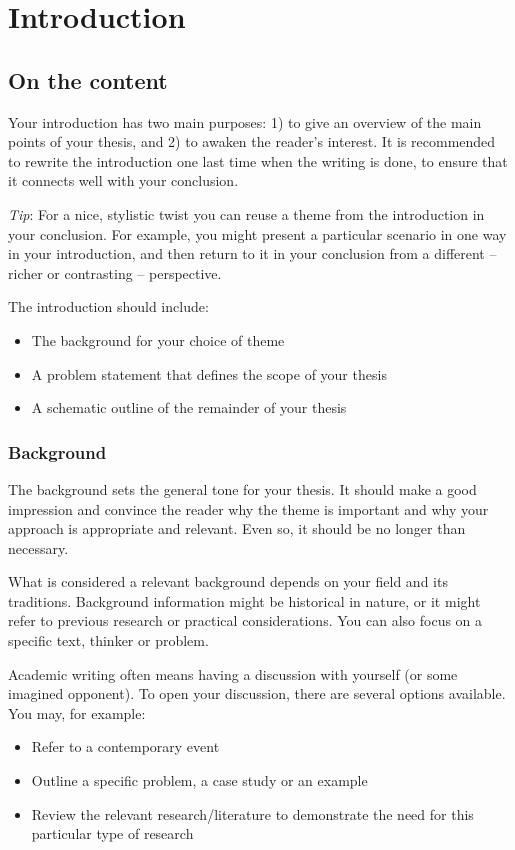 \chapter{Introduction}
\label{chp:introduction}  %
 

\section{On the content}
Your introduction has two main purposes: 1) to give an overview of the main points of your thesis, and 2) to awaken the reader's interest. It is recommended to rewrite the introduction one last time when the writing is done, to ensure that it connects well with your conclusion.

\emph{Tip}: For a nice, stylistic twist you can reuse a theme from the introduction in your conclusion. For example, you might present a particular scenario in one way in your introduction, and then return to it in your conclusion from a different -- richer or contrasting -- perspective.

The introduction should include:
\begin{itemize}
    \item The background for your choice of theme
    \item A problem statement that defines the scope of your thesis
    \item A schematic outline of the remainder of your thesis 
\end{itemize}

\subsection{Background}
The background sets the general tone for your thesis. It should make a good impression and convince the reader why the theme is important and why your approach is appropriate and relevant. Even so, it should be no longer than necessary.

What is considered a relevant background depends on your field and its traditions. Background information might be historical in nature, or it might refer to previous research or practical considerations. You can also focus on a specific text, thinker or problem.

Academic writing often means having a discussion with yourself (or some imagined opponent). To open your discussion, there are several options available. You may, for example:
\begin{itemize}
    \item Refer to a contemporary event
    \item Outline a specific problem, a case study or an example
    \item Review the relevant research/literature to demonstrate the need for this particular type of research 
\end{itemize}

